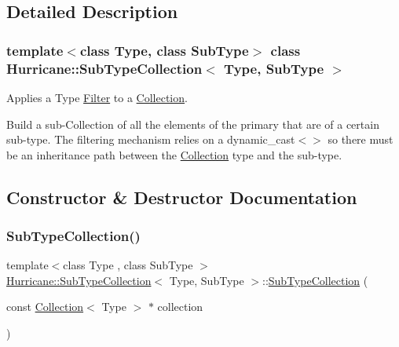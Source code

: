 \subsection{Detailed Description}
\subsubsection*{template$<$class Type, class Sub\+Type$>$\newline
class Hurricane\+::\+Sub\+Type\+Collection$<$ Type, Sub\+Type $>$}

Applies a Type \hyperlink{classHurricane_1_1Filter}{Filter} to a \hyperlink{classHurricane_1_1Collection}{Collection}. 

Build a sub-\/\+Collection of all the elements of the primary that are of a certain sub-\/type. The filtering mechanism relies on a {\ttfamily dynamic\+\_\+cast$<$$>$} so there must be an inheritance path between the \hyperlink{classHurricane_1_1Collection}{Collection} type and the sub-\/type. 

\subsection{Constructor \& Destructor Documentation}
\mbox{\label{classHurricane_1_1SubTypeCollection_a0fd6c8e781097e607b813306fd2ad677}} 
\subsubsection{\texorpdfstring{Sub\+Type\+Collection()}{SubTypeCollection()}\hspace{0.1cm}{\footnotesize\ttfamily [1/3]}}
{\footnotesize\ttfamily template$<$class Type , class Sub\+Type $>$ \\
\hyperlink{classHurricane_1_1SubTypeCollection}{Hurricane\+::\+Sub\+Type\+Collection}$<$ Type, Sub\+Type $>$\+::\hyperlink{classHurricane_1_1SubTypeCollection}{Sub\+Type\+Collection} (\begin{DoxyParamCaption}\item[{const \hyperlink{classHurricane_1_1Collection}{Collection}$<$ Type $>$ $\ast$}]{collection }\end{DoxyParamCaption})\hspace{0.3cm}{\ttfamily [inline]}}

